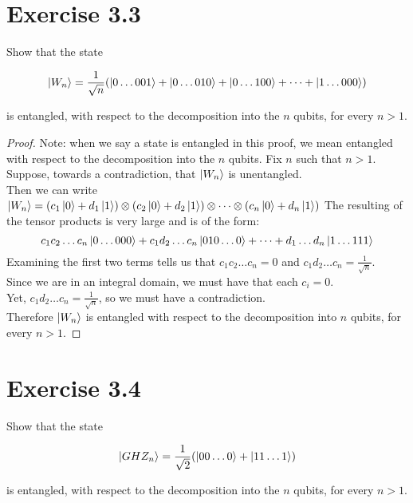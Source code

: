 \documentclass[11pt]{article}
\def\srtt{\ensuremath\frac{1}{\sqrt{2}}}
\begin{document}
\section*{Exercise 3.3}

Show that the state 

$$\ket{W_n} = \frac{1}{\sqrt{n}}(\ket{0\dots001} + \ket{0\dots010} + \ket{0\dots100} 
+ \cdots + \ket{1\dots000})$$

is entangled, with respect to the decomposition into the $n$ qubits, for every $n > 1$.

\begin{proof}
    Note: when we say a state is entangled in this proof, we mean entangled with respect to the decomposition into the $n$ qubits. 
    Fix $n$ such that $n>1$. \\ Suppose, towards a contradiction, that $\ket{W_n}$ is unentangled. \\
    Then we can write $\ket{W_n} = (c_1\ket{0} + d_1\ket{1}) \otimes (c_2\ket{0} + d_2\ket{1}) \otimes \cdots \otimes (c_n\ket{0} + d_n\ket{1})$
    The resulting of the tensor products is very large and is of the form: 
    $$c_1c_2\dots c_n\ket{0\dots000} + c_1d_2\dots c_n\ket{010\dots0} + \cdots + d_1\dots d_n\ket{1\dots111}$$
    Examining the first two terms tells us that $c_1c_2\dots c_n = 0$ and $c_1d_2\dots c_n = \frac{1}{\sqrt{n}}$. \\
    Since we are in an integral domain, we must have that each $c_i = 0$. \\
    Yet, $c_1d_2\dots c_n = \frac{1}{\sqrt{n}}$, so we must have a contradiction.  \\
    Therefore $\ket{W_n}$ is entangled with respect to the decomposition into $n$ qubits, for every $n > 1$.
\end{proof}
\newpage
\section*{Exercise 3.4}

Show that the state 

$$\ket{GHZ_n} = \srtt(\ket{00\dots0} + \ket{11\dots1})$$

is entangled, with respect to the decomposition into the $n$ qubits, for every $n > 1$.
\end{document}
